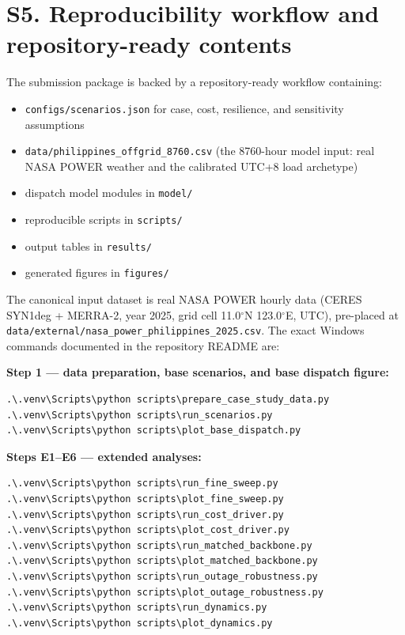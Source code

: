 \documentclass[11pt]{article}
\begin{document}
\section*{S5. Reproducibility workflow and repository-ready contents}
The submission package is backed by a repository-ready workflow containing:
\begin{itemize}[leftmargin=1.5em]
  \item \texttt{configs/scenarios.json} for case, cost, resilience, and sensitivity assumptions
  \item \texttt{data/philippines\_offgrid\_8760.csv} (the 8760-hour model input: real NASA POWER weather and the calibrated UTC+8 load archetype)
  \item dispatch model modules in \texttt{model/}
  \item reproducible scripts in \texttt{scripts/}
  \item output tables in \texttt{results/}
  \item generated figures in \texttt{figures/}
\end{itemize}

The canonical input dataset is real NASA POWER hourly data (CERES SYN1deg + MERRA-2, year 2025, grid cell 11.0$^\circ$N 123.0$^\circ$E, UTC), pre-placed at \texttt{data/external/\allowbreak nasa\_\allowbreak power\_\allowbreak philippines\_2025.csv}. The exact Windows commands documented in the repository README are:

\textbf{Step 1 --- data preparation, base scenarios, and base dispatch figure:}
\begin{verbatim}
.\.venv\Scripts\python scripts\prepare_case_study_data.py
.\.venv\Scripts\python scripts\run_scenarios.py
.\.venv\Scripts\python scripts\plot_base_dispatch.py
\end{verbatim}

\textbf{Steps E1--E6 --- extended analyses:}
\begin{verbatim}
.\.venv\Scripts\python scripts\run_fine_sweep.py
.\.venv\Scripts\python scripts\plot_fine_sweep.py
.\.venv\Scripts\python scripts\run_cost_driver.py
.\.venv\Scripts\python scripts\plot_cost_driver.py
.\.venv\Scripts\python scripts\run_matched_backbone.py
.\.venv\Scripts\python scripts\plot_matched_backbone.py
.\.venv\Scripts\python scripts\run_outage_robustness.py
.\.venv\Scripts\python scripts\plot_outage_robustness.py
.\.venv\Scripts\python scripts\run_dynamics.py
.\.venv\Scripts\python scripts\plot_dynamics.py
\end{verbatim}
\end{document}
